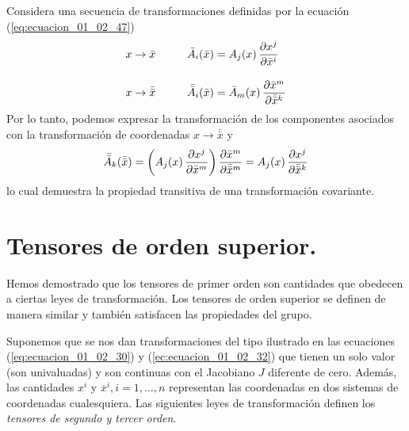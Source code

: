 \documentclass[hidelinks,12pt]{article}
\begin{document}
Considera una secuencia de transformaciones definidas por la ecuación (\ref{eq:ecuacion_01_02_47})
\begin{align*}
    x &\to \bar{x} \hspace{1cm} \bar{A}_{i} (\bar{x}) = A_{j} (x) \, \pdv{x^{j}}{\bar{x}^{i}} \\[1em]
    x &\to \bar{\bar{x}} \hspace{1cm} \bar{\bar{A}}_{i} (\bar{x}) = \bar{A}_{m} (x) \, \pdv{\bar{x}^{m}}{\bar{\bar{x}}^{k}}
\end{align*}
Por lo tanto, podemos expresar la transformación de los componentes asociados con la transformación de coordenadas $x \to \bar{\bar{x}}$ y
\begin{align*}
    \bar{\bar{A}}_{k} (\bar{\bar{x}}) = \left( A_{j} (x) \, \pdv{x^{j}}{\bar{x}^{m}} \right) \pdv{\bar{x}^{m}}{\bar{\bar{x}}^{m}} = A_{j} (x) \, \pdv{x^{j}}{\bar{\bar{x}}^{k}}
\end{align*}
lo cual demuestra la propiedad transitiva de una transformación covariante.

\section{Tensores de orden superior.}

Hemos demostrado que los tensores de primer orden son cantidades que obedecen a ciertas leyes de transformación. Los tensores de orden superior se definen de manera similar y también satisfacen las propiedades del grupo.
\par
Suponemos que se nos dan transformaciones del tipo ilustrado en las ecuaciones (\ref{eq:ecuacion_01_02_30}) y (\ref{ec:ecuacion_01_02_32}) que tienen un solo valor (son univaluadas) y son continuas con el Jacobiano $J$ diferente de cero. Además, las cantidades $x^{i}$ y $\overline{x}^{i}, i = 1, \ldots, n$ representan las coordenadas en dos sistemas de coordenadas cualesquiera. Las siguientes leyes de transformación definen los \emph{tensores de segundo y tercer orden}.
\begin{center}
    \noindent{}
\end{center}
\end{document}

